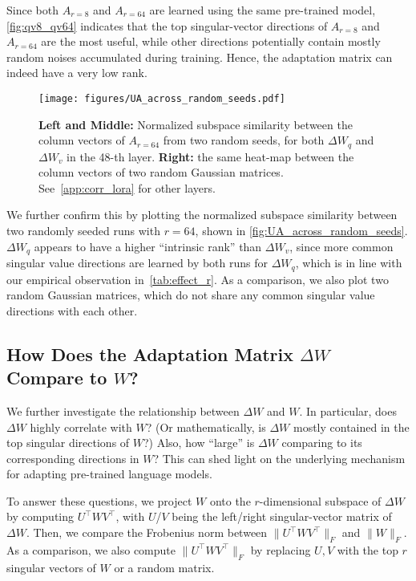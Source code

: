 Since both  $A_{r=8}$ and $A_{r=64}$ are learned using the same pre-trained model, \autoref{fig:qv8_qv64} indicates that the top singular-vector directions of $A_{r=8}$ and $A_{r=64}$ are the most useful, while other directions potentially contain mostly random noises accumulated during training.
Hence, the adaptation matrix can indeed have a very low rank.


\begin{figure}[h]
  \centering
    \texttt{[image: figures/UA\_across\_random\_seeds.pdf]}
    \caption{\textbf{Left and Middle:} Normalized subspace similarity between the column vectors of $A_{r=64}$ from two random seeds, for both $\Delta W_q$ and $\Delta W_v$ in the 48-th layer. \textbf{Right:} the same heat-map between the column vectors of two random Gaussian matrices. See~\autoref{app:corr_lora} for other layers.}
    \label{fig:UA_across_random_seeds}
\end{figure}

We further confirm this by plotting the normalized subspace similarity between two randomly seeded runs with $r=64$, shown in \autoref{fig:UA_across_random_seeds}.
$\Delta W_q$ appears to have a higher ``intrinsic rank'' than $\Delta W_v$, since more common singular value directions are learned by both runs for $\Delta W_q$, which is in line with our empirical observation in~\autoref{tab:effect_r}.
As a comparison, we also plot two random Gaussian matrices, which do not share any common singular value directions with each other.



\subsection{How Does the Adaptation Matrix $\Delta W$ Compare to $W$?}
\label{sec:compare_delta_w_to_w}
We further investigate the relationship between $\Delta W$ and $W$.
In particular, does $\Delta W$ highly correlate with $W$? (Or mathematically, is $\Delta W$ mostly contained in the top singular directions of $W$?) Also, how ``large'' is $\Delta W$ comparing to its corresponding directions in $W$?
This can shed light on the underlying mechanism for adapting pre-trained language models. 

To answer these questions, we project $W$ onto the $r$-dimensional subspace of $\Delta W$ by computing $U^\top W V^\top$, with $U$/$V$ being the left/right singular-vector matrix of $\Delta W$. Then, we compare the Frobenius norm between $\|U^\top W V^\top\|_F$ and $\|W\|_F$. 
As a comparison, we also compute $\|U^\top W V^\top\|_F$ by replacing $U,V$ with the top $r$ singular vectors of $W$ or a random matrix.



